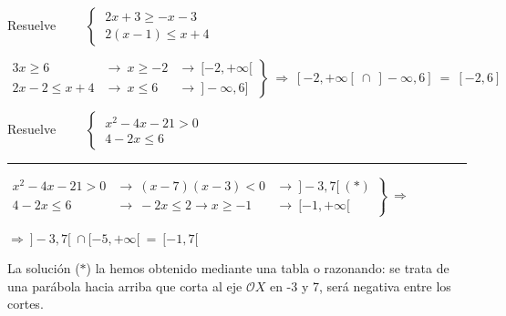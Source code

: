 \vspace{4mm}
\begin{miejemplo}

Resuelve $\qquad \begin{cases} \ 2x+3 \geqslant -x-3 \\ \ 2(x-1) \leqslant x+4 \end{cases} $

\vspace{5mm} $\left. \begin{array}{lll} 3x\geqslant 6 & \to \ x\geqslant -2 &\to \ [-2,+\infty[ \\ 2x-2\leqslant x+4 & \to \ x\leqslant 6 &\to \ ]-\infty,6] \end{array} \right\} \ \Rightarrow \ [-2,+\infty[ \ \cap \ ]-\infty,6] \ = \ [-2,6]$

\end{miejemplo}

\begin{miejercicio}

Resuelve $\qquad \begin{cases} \ x^2-4x-21 >0\\ \ 4-2x \leqslant 6 \end{cases}$	

\vspace{2mm}
\rule{250pt}{0.5pt}

\vspace{5mm} $\left. \begin{array}{lll} 
	x^2-4x-21 > 0 &\to \ (x-7)(x-3)<0 &\to \ ]-3,7[\ (*) \\
	4-2x\leqslant 6 &\to \ -2x\leqslant 2 \to x\geqslant -1 &\to \ [-1,+\infty[
 \end{array}\right\} \  \Rightarrow $
 
 \vspace{2mm} $\Rightarrow \  ]-3,7[ \ \cap [-5,+\infty[ \ = \ [-1,7[$

\vspace{2mm} \begin{small} \textcolor{gris}{La solución ($*$) la hemos obtenido mediante una tabla o razonando: se trata de una parábola hacia arriba que corta al eje $\mathcal OX$ en -3 y 7, será negativa entre los cortes.} \end{small}

\vspace{2mm} 	
\end{miejercicio}


